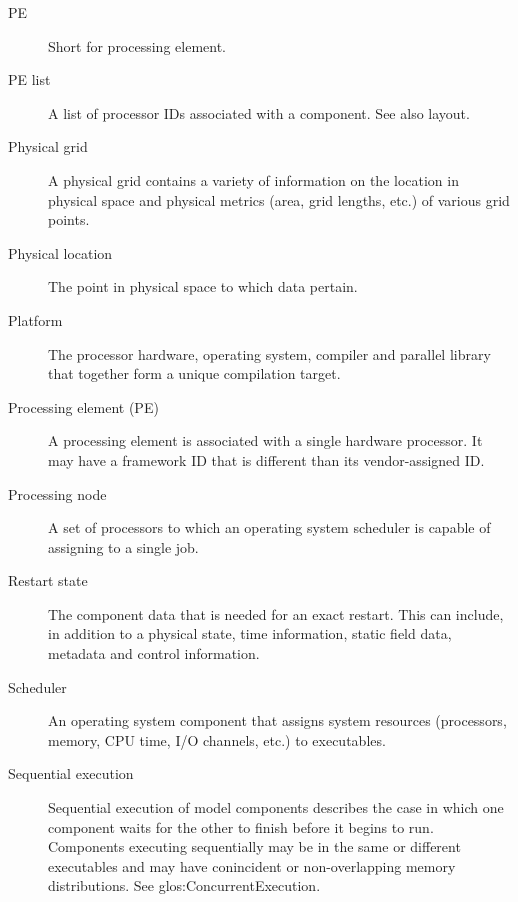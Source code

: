 \begin{description}
\item[PE] \label{glos:PE} Short for processing element.

\item[PE list] \label{glos:PElist} A list of processor IDs associated 
  with a component.  See also layout.

\item[Physical grid] \label{term:PhysGrid} 
  A physical grid contains a variety of information
  on the location in physical space and physical metrics (area,
  grid lengths, etc.) of various grid points.

\item[Physical location] \label{glos:PhysLoc} The point in physical space 
  to which data pertain. 

\item[Platform] \label{glos:Platform} 
  The processor hardware, operating system, compiler and
  parallel library that together form a unique compilation target.

\item[Processing element (PE)] \label{glos:Processing_Element}
A processing element is associated with a single hardware processor.  It may
have a framework ID that is different than its vendor-assigned ID.  

\item[Processing node] \label{glos:Pnode} A set of processors to which an
  operating system scheduler is capable of assigning to a single job.

\item[Restart state] \label{glos:RestartState} The component 
  data that 
  is needed for an exact restart. This can include, in addition to 
  a physical state,  time information, static field data,
  metadata and control information. 

\item[Scheduler] \label{glos:Scheduler} An operating system component 
  that assigns system
  resources (processors, memory, CPU time, I/O channels, etc.) to
  executables.

\item[Sequential execution] \label{glos:SequentialExecution}
Sequential execution of model components describes the case in which 
one component waits for the other to finish before it begins
to run.  Components executing sequentially may be in the same or 
different executables and may have conincident or non-overlapping 
memory distributions.  See 
{glos:ConcurrentExecution}.


\end{description}
